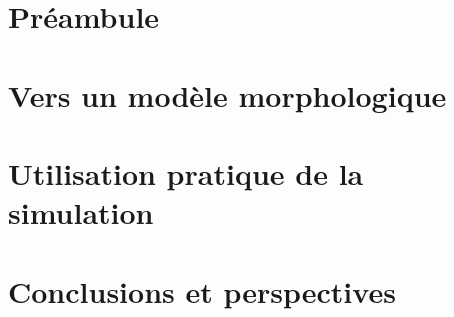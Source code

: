 \documentclass[ twoside,openright,titlepage,numbers=noenddot,headinclude,%
                footinclude=true,cleardoublepage=empty,abstractoff, %
                BCOR=5mm,paper=a4,fontsize=11pt,%
                francais ,ngerman,american%
                ]{scrreprt}
\begin{document}
\frenchspacing
\raggedbottom
{} %
\renewcommand*{\bibname}{Bibliographie}
\pagestyle{plain}




\cleardoublepage
\cleardoublepage
\cleardoublepage
\cleardoublepage
\pagestyle{scrheadings}
\cleardoublepage

\cleardoublepage{}

\cleardoublepage
{}
\part{Préambule \label{part:preamb}}


\cleardoublepage
{}
\part{Vers un modèle morphologique \label{part:model}}



\cleardoublepage
{}
\part{Utilisation pratique de la simulation \label{part:simu}}



\cleardoublepage
{}
\part{Conclusions et perspectives \label{part:conc}}


% 
% 
% 
% 
\end{document}
